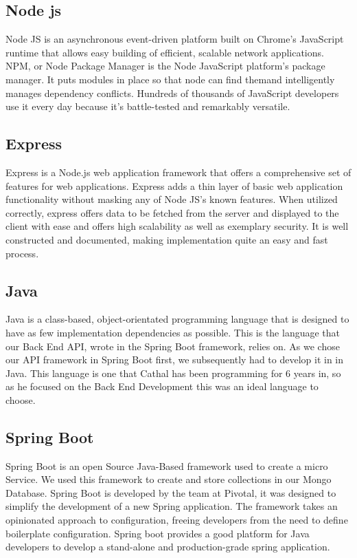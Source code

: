 \subsection{Node js}
\cite{NodsJS}Node JS is an asynchronous event-driven platform built on Chrome's JavaScript runtime that allows easy building of efficient, scalable network applications. NPM, or Node Package Manager is the Node JavaScript platform's package manager. It puts modules in place so that node can find themand intelligently manages dependency conflicts. Hundreds of thousands of JavaScript developers use it every day because it's battle-tested and remarkably versatile.

\subsection{Express}
\cite{ExpressJS}Express is a Node.js web application framework that offers a comprehensive set of features for web applications. Express adds a thin layer of basic web application functionality without masking any of Node JS's known features. When utilized correctly, express offers data to be fetched from the server and displayed to the client with ease and offers high scalability as well as exemplary security. It is well constructed and documented, making implementation quite an easy and fast process.

\subsection{Java}
Java is a class-based, object-orientated programming language that is designed to have as few implementation dependencies as possible. This is the language that our Back End API, wrote in the Spring Boot framework, relies on. As we chose our API framework in Spring Boot first, we subsequently had to develop it in in Java. This language is one that Cathal has been programming for 6 years in, so as he focused on the Back End Development this was an ideal language to choose.

\subsection{Spring Boot}
Spring Boot is an open Source Java-Based framework used to create a micro Service. We used this framework to create and store collections in our Mongo Database. Spring Boot is developed by the team at Pivotal, it was designed to simplify the development of a new Spring application. The framework takes an opinionated approach to configuration, freeing developers from the need to define boilerplate configuration. Spring boot provides a good platform for Java developers to develop a stand-alone and production-grade spring application.

